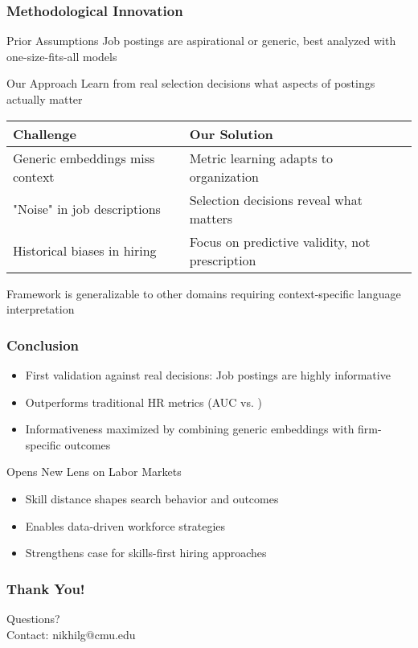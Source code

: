 \documentclass[aspectratio=169]{beamer}
\begin{document}
\begin{frame}
\frametitle{Methodological Innovation}

\begin{block}{Prior Assumptions}
Job postings are aspirational or generic, best analyzed with one-size-fits-all models
\end{block}

\begin{block}{Our Approach}
Learn from real selection decisions what aspects of postings actually matter
\end{block}
\vspace{1em}

\begin{center}
\begin{tabular}{|l|l|}
\hline
\headrow
\textbf{Challenge} & \textbf{Our Solution} \\
\hline
Generic embeddings miss context & Metric learning adapts to organization \\
"Noise" in job descriptions & Selection decisions reveal what matters \\
Historical biases in hiring & Focus on predictive validity, not prescription \\
\hline
\end{tabular}
\end{center}
\vspace{1em}

Framework is generalizable to other domains requiring
context-specific language interpretation
\end{frame}

\begin{frame}
\frametitle{Conclusion}

\begin{itemize}
\item First validation against real decisions: Job postings are highly informative
\item Outperforms traditional HR metrics (AUC  vs. )
\item Informativeness maximized by combining generic embeddings with firm-specific outcomes
\end{itemize}

\begin{block}{Opens New Lens on Labor Markets}
\begin{itemize}
\item Skill distance shapes search behavior and outcomes
\item Enables data-driven workforce strategies
\item Strengthens case for skills-first hiring approaches
\end{itemize}
\end{block}

\begin{center}
\end{center}
\end{frame}

\begin{frame}
\frametitle{Thank You!}
\begin{center}
\LARGE Questions?\\
\vspace{1cm}
\normalsize
Contact: nikhilg@cmu.edu
\end{center}
\end{frame}
\end{document}
